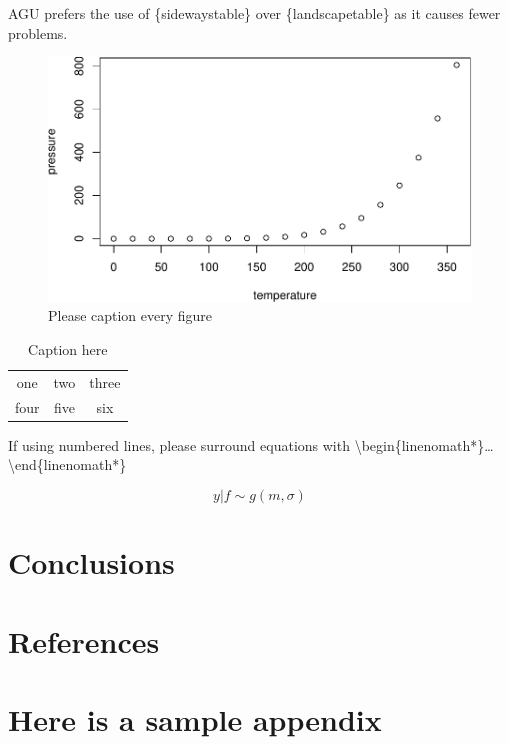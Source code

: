 \documentclass[draft,linenumbers]{agujournal2018}
\begin{document}
AGU prefers the use of \{sidewaystable\} over \{landscapetable\} as it
causes fewer problems.

\begin{figure}
\includegraphics{True_Uncertainty_of_Water_Level_Measurements_after_Addressing_Temperature_Effects_files/figure-latex/unnamed-chunk-3-1} \caption{Please caption every figure}\label{fig:unnamed-chunk-3}
\end{figure}

\begin{table}
\caption{Caption here}
\label{tab:signif_gap_clos}
\begin{tabular}{ccc}
one&two&three\\
four&five&six
\end{tabular}
\end{table}

If using numbered lines, please surround equations with
\textbackslash{}begin\{linenomath*\}\ldots{}
\textbackslash{}end\{linenomath*\}

\begin{linenomath*}
\begin{equation}
y|{f} \sim g(m, \sigma)
\end{equation}
\end{linenomath*}

\section{Conclusions}

\section{References}

\appendix
\section{Here is a sample appendix}
\end{document}
